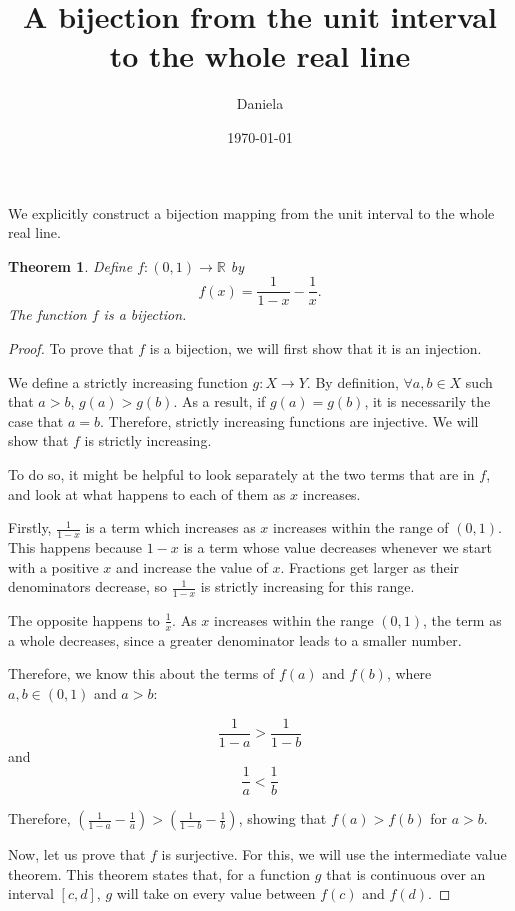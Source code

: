 \documentclass[11pt,reqno,oneside,a4paper]{article}
\title{A bijection from the unit interval to the whole real line}
\author{Daniela}
\date{\today}
\newtheorem{theorem}{Theorem}
\begin{document}
\maketitle


We explicitly construct a bijection mapping from the unit interval to the whole real line.

\begin{theorem} \label{thm:BijectionRInterval}
	Define $f : (0,1) \to \mathbb{R}$ by
	$$
		f(x) =\frac{1}{1-x} - \frac{1}{x}.
	$$
	The function $f$ is a bijection.
\end{theorem}

\begin{proof}

To prove that $f$ is a bijection, we will first show that it is an injection.

We define a strictly increasing function $g: X \rightarrow Y$. By definition, $\forall a, b \in X$ such that $a > b$, $g(a) > g(b)$. As a result, if $g(a) = g(b)$, it is necessarily the case that $a = b$. Therefore, strictly increasing functions are injective. We will show that $f$ is strictly increasing.

To do so, it might be helpful to look separately at the two terms that are in $f$, and look at what happens to each of them as $x$ increases.

Firstly, $\frac{1}{1-x}$ is a term which increases as $x$ increases within the range of $(0,1)$. This happens because $1 - x$ is a term whose value decreases whenever we start with a positive $x$ and increase the value of $x$. Fractions get larger as their denominators decrease, so $\frac{1}{1-x}$ is strictly increasing for this range.

The opposite happens to $\frac{1}{x}$. As $x$ increases within the range $(0,1)$, the term as a whole decreases, since a greater denominator leads to a smaller number.

Therefore, we know this about the terms of $f(a)$ and $f(b)$, where  $a, b \in (0,1)$ and $a > b$:

$$\frac{1}{1-a} > \frac{1}{1-b} $$ 
and 
$$\frac{1}{a} < \frac{1}{b} $$

Therefore, $\left(\frac{1}{1-a} - \frac{1}{a}\right) >  \left(\frac{1}{1-b} - \frac{1}{b}\right)$, showing that $f(a) > f(b)$ for $a>b$.

Now, let us prove that $f$ is surjective. For this, we will use the intermediate value theorem. This theorem states that, for a function $g$ that is continuous over an interval $[c,d]$, $g$ will take on every value between $f(c)$ and $f(d)$. 


\end{proof}
\end{document}
